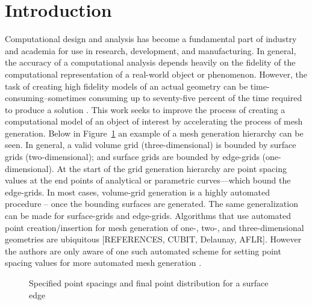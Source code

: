 \section{Introduction}Computational design and analysis has become a 
fundamental part of industry and academia for use in research, 
development, and manufacturing. In general, the accuracy of a 
computational analysis depends heavily on the fidelity of the 
computational representation of a real-world object or phenomenon. 
However, the task of creating high fidelity models of an actual geometry 
can be time-consuming--sometimes consuming up to seventy-five percent of 
the time required to produce a solution \cite{bischoff05}. This work seeks
to improve the process of creating a computational model of an object of
interest by accelerating the process of mesh generation. Below in
Figure~\ref{GridGenerationProcess} an example of a mesh generation hierarchy
can be seen. In general, a valid volume grid (three-dimensional) is bounded
by surface grids (two-dimensional); and surface grids are bounded by edge-grids
(one-dimensional). At the start of the grid generation hierarchy are point
spacing values at the end points of analytical or parametric curves—which
bound the edge-grids. In most cases, volume-grid generation is a highly
automated procedure -- once the bounding surfaces are generated. The same
generalization can be made for surface-grids and edge-grids. Algorithms
that use automated point creation/insertion for mesh generation of one-,
two-, and three-dimensional geometries are ubiquitous [REFERENCES, CUBIT,
Delaunay, AFLR]. However the authors are only aware of one such automated
scheme for setting point spacing values for more automated mesh generation \cite{mclaurin12}.\\

\begin{figure}[h!]
 \caption{\label{GridGenerationProcess} Specified point spacings and final point distribution for a surface edge \cite{thompson98}}
\end{figure}

